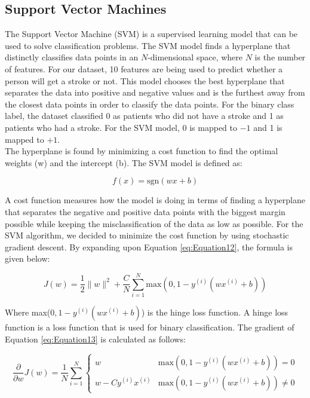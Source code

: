 \subsection{Support Vector Machines}
\label{sec:methods:Support Vector Machines}

The Support Vector Machine (SVM) is a supervised learning model that can be used to solve classification problems. The SVM model finds a hyperplane that distinctly classifies data points in an $N$-dimensional space, where $N$ is the number of features. For our dataset, 10 features are being used to predict whether a person will get a stroke or not. This model chooses the best hyperplane that separates the data into positive and negative values and is the furthest away from the closest data points in order to classify the data points. For the binary class label, the dataset classified 0 as patients who did not have a stroke and 1 as patients who had a stroke. For the SVM model, 0 is mapped to $-1$ and 1 is mapped to $+1$.\\

\noindent The hyperplane is found by minimizing a cost function to find the optimal weights (w) and the intercept (b). The SVM model is defined as:

\begin{equation}
    \label{eq:Equation12}
    f(x) = \mathrm{sgn}(wx + b)
\end{equation}

\noindent A cost function measures how the model is doing in terms of finding a hyperplane that separates the negative and positive data points with the biggest margin possible while keeping the misclassification of the data as low as possible. For the SVM algorithm, we decided to minimize the cost function by using stochastic gradient descent. By expanding upon Equation \eqref{eq:Equation12}, the formula is given below:

\begin{equation}
    \label{eq:Equation13}
    J(w) = \dfrac{1}{2} \lVert w \rVert^2 + \dfrac{C}{N} \sum_{i = 1}^{N} \mathrm{max}(0, 1 - y^{(i)}(wx^{(i)} + b))
\end{equation}

\noindent Where max($0, 1 - y^{(i)}(wx^{(i)} + b)$) is the hinge loss function. A hinge loss function is a loss function that is used for binary classification. The gradient of Equation \eqref{eq:Equation13} is calculated as follows:

\begin{equation}
    \label{eq:Equation14}
    \dfrac{\partial}{\partial{w}}J(w) = \dfrac{1}{N} \sum_{i = 1}^{N}
    \begin{cases}
        w & \mathrm{max}(0, 1 - y^{(i)}(wx^{(i)} + b)) = 0\\
        w - Cy^{(i)}x^{(i)} & \mathrm{max}(0, 1 - y^{(i)}(wx^{(i)} + b)) \neq 0
    \end{cases}
\end{equation}

